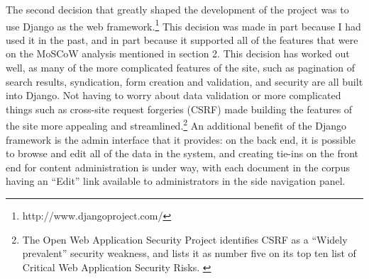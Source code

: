 The second decision that greatly shaped the development of the project was to use Django as the web framework.\footnote{http://www.djangoproject.com/} This decision was made in part because I had used it in the past, and in part because it supported all of the features that were on the MoSCoW analysis mentioned in section 2. This decision has worked out well, as many of the more complicated features of the site, such as pagination of search results, syndication, form creation and validation, and security are all built into Django. Not having to worry about data validation or more complicated things such as cross-site request forgeries (CSRF) made building the features of the site more appealing and streamlined.\footnote{The Open Web Application Security Project identifies CSRF as a ``Widely prevalent'' security weakness, and lists it as number five on its top ten list of Critical Web Application Security Risks. \cite{open_web_application_security_project_owasp_2010}} An additional benefit of the Django framework is the admin interface that it provides: on the back end, it is possible to browse and edit all of the data in the system, and creating tie-ins on the front end for content administration is under way, with each document in the corpus having an ``Edit'' link available to administrators in the side navigation panel.

